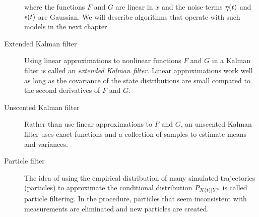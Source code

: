 \begin{description}
  where the functions $F$ and $G$ are linear in $x$ and the noise
  terms ${\eta}{(t)}$ and ${\epsilon}{(t)}$ are Gaussian.  We will
  describe algorithms that operate with such models in the next
  chapter.
\item[Extended Kalman filter] Using linear approximations to nonlinear
  functions $F$ and $G$ in a Kalman filter is called an \emph{extended
  Kalman filter}.  Linear approximations work well as long as the
  covariance of the state distributions are small compared to the
  second derivatives of $F$ and $G$.
\item[Unscented Kalman filter] Rather than use linear approximations
  to $F$ and $G$, an unscented Kalman filter\cite{Julier97} uses exact
  functions and a collection of samples to estimate means and
  variances.
\item[Particle filter] The idea of using the empirical distribution of
  many simulated trajectories (particles) to approximate the
  conditional distribution $P_{{X}{(t)}|Y_{1}^{t}}$ is called
  particle filtering\cite{Gordon93,Kitagawa96}.  In the procedure,
  particles that seem inconsistent with measurements are eliminated
  and new particles are created. 
\end{description}

